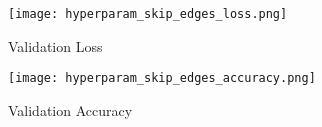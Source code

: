 \begin{figure}
    \centering
    \begin{subfigure}[l]{0.5\textwidth}
        \texttt{[image: hyperparam\_skip\_edges\_loss.png]}
        \label{fig:hyperparam_skip_edges_loss}
        \caption{Validation Loss}
    \end{subfigure}
    \begin{subfigure}[r]{0.49\textwidth}
        \texttt{[image: hyperparam\_skip\_edges\_accuracy.png]}
        \label{fig:hyperparam_skip_edges_accuracy}
        \caption{Validation Accuracy}
    \end{subfigure}
    \caption{}
    \label{fig:hyperparam_skip_edges_loss_and_accuracy}
\end{figure}

